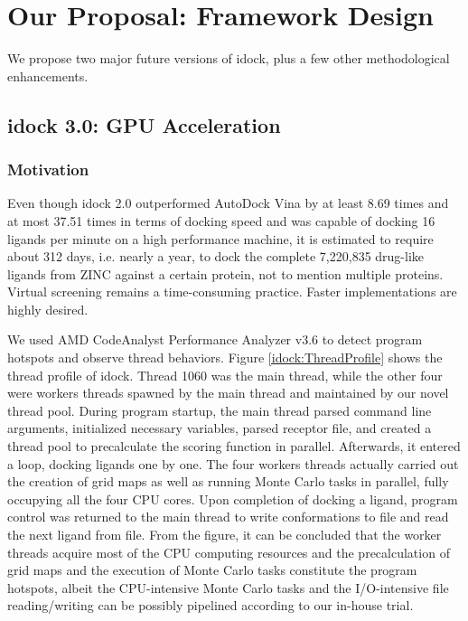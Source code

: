 \chapter{Our Proposal: Framework Design}

We propose two major future versions of idock, plus a few other methodological enhancements.

\section{idock 3.0: GPU Acceleration}

\subsection{Motivation}

Even though idock 2.0 outperformed AutoDock Vina \citep{595} by at least 8.69 times and at most 37.51 times in terms of docking speed and was capable of docking 16 ligands per minute on a high performance machine, it is estimated to require about 312 days, i.e. nearly a year, to dock the complete 7,220,835 drug-like ligands from ZINC against a certain protein, not to mention multiple proteins. Virtual screening remains a time-consuming practice. Faster implementations are highly desired.

We used AMD CodeAnalyst Performance Analyzer v3.6 to detect program hotspots and observe thread behaviors. Figure \ref{idock:ThreadProfile} shows the thread profile of idock. Thread 1060 was the main thread, while the other four were workers threads spawned by the main thread and maintained by our novel thread pool. During program startup, the main thread parsed command line arguments, initialized necessary variables, parsed receptor file, and created a thread pool to precalculate the scoring function in parallel. Afterwards, it entered a loop, docking ligands one by one. The four workers threads actually carried out the creation of grid maps as well as running Monte Carlo tasks in parallel, fully occupying all the four CPU cores. Upon completion of docking a ligand, program control was returned to the main thread to write conformations to file and read the next ligand from file. From the figure, it can be concluded that the worker threads acquire most of the CPU computing resources and the precalculation of grid maps and the execution of Monte Carlo tasks constitute the program hotspots, albeit the CPU-intensive Monte Carlo tasks and the I/O-intensive file reading/writing can be possibly pipelined according to our in-house trial.

